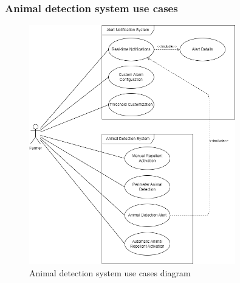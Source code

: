 \subsubsection*{Animal detection system use cases}
\begin{figure}[H]
    \centering
    \includegraphics[width=0.8\textwidth]{./images/6/alert_animal_uses.png}
    \caption{Animal detection system use cases diagram}
\end{figure}
